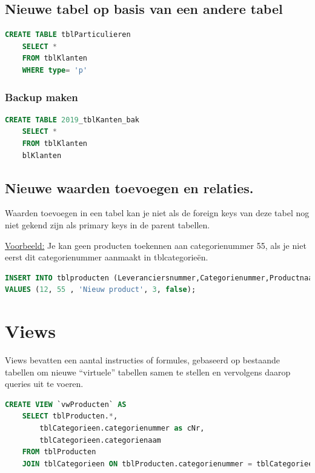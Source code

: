 \documentclass{article}
\begin{document}
\subsection{Nieuwe tabel op basis van een andere tabel}

\begin{lstlisting}[language=SQL]
CREATE TABLE tblParticulieren
    SELECT *
    FROM tblKlanten
    WHERE type= 'p'
\end{lstlisting}

\subsubsection{Backup maken}
\begin{lstlisting}[language=SQL]
CREATE TABLE 2019_tblKanten_bak
    SELECT *
    FROM tblKlanten
    blKlanten
\end{lstlisting}

\subsection{Nieuwe waarden toevoegen en relaties.}
Waarden toevoegen in een tabel kan je niet als de foreign keys van deze tabel nog niet gekend zijn als primary keys in de parent tabellen.

\underline{Voorbeeld:}
Je kan geen producten toekennen aan categorienummer 55, als je niet eerst dit categorienummer aanmaakt in tblcategorieën.
\begin{lstlisting}[language=SQL]
INSERT INTO tblproducten (Leveranciersnummer,Categorienummer,Productnaam, BTWCode , UitAssortiment)
VALUES (12, 55 , 'Nieuw product', 3, false);
\end{lstlisting}

\section{Views}
Views bevatten een aantal instructies of formules, gebaseerd op bestaande tabellen om nieuwe “virtuele”
tabellen samen te stellen en vervolgens daarop queries uit te voeren.

\begin{lstlisting}[language=SQL]
CREATE VIEW `vwProducten` AS
    SELECT tblProducten.*, 
        tblCategorieen.categorienummer as cNr, 
        tblCategorieen.categorienaam
    FROM tblProducten
    JOIN tblCategorieen ON tblProducten.categorienummer = tblCategorieen.categorienummer
\end{lstlisting}
\end{document}
